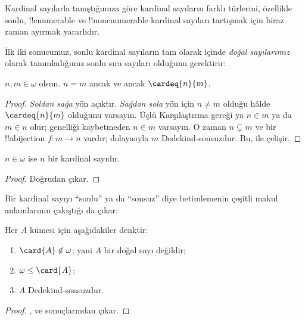 \documentclass[../../../include/open-logic-section]{subfiles}
\begin{document}

Kardinal sayılarla tanıştığımıza göre kardinal sayıların farklı türlerini,
özellikle sonlu, !!{enumerable} ve !!{nonenumerable} kardinal sayıları
tartışmak için biraz zaman ayırmak yararlıdır.

İlk iki sonucumuz, sonlu kardinal sayıların tam olarak
 içinde \emph{doğal sayılarımız}
olarak tanımladığımız sonlu sıra sayıları olduğunu gerektirir:

\begin{prop}
$n,m\in\omega$ olsun. $n=m$ ancak ve ancak $\cardeq{n}{m}$.
\end{prop}

\begin{proof}
\emph{Soldan sağa} yön açıktır. \emph{Sağdan sola} yön için $n\neq m$
olduğu hâlde $\cardeq{n}{m}$ olduğunu varsayın. Üçlü Karşılaştırma gereği
ya $n\in m$ ya da $m\in n$ olur; genelliği kaybetmeden $n\in m$ varsayın.
O zaman $n\subsetneq m$ ve bir !!a{bijection} $f\colon m\to n$ vardır;
dolayısıyla $m$ Dedekind-sonsuzdur. Bu,
 ile çelişir.
\end{proof}

\begin{cor}
$n\in\omega$ ise $n$ bir kardinal sayıdır.
\end{cor}

\begin{proof}
Doğrudan çıkar.
\end{proof}
\noindent
Bir kardinal sayıyı ``sonlu'' ya da ``sonsuz'' diye betimlemenin çeşitli
makul anlamlarının çakıştığı da çıkar:
\begin{thm}
Her $A$ kümesi için aşağıdakiler denktir:
\begin{enumerate}
	\item{} $\card{A}\notin\omega$; yani $A$ bir
	doğal sayı değildir;
	\item{} $\omega\leq\card{A}$;
	\item{} $A$ Dedekind-sonsuzdur.
\end{enumerate}
\end{thm}

\begin{proof}
,
 ve
 sonuçlarından çıkar.
\end{proof}
\end{document}
